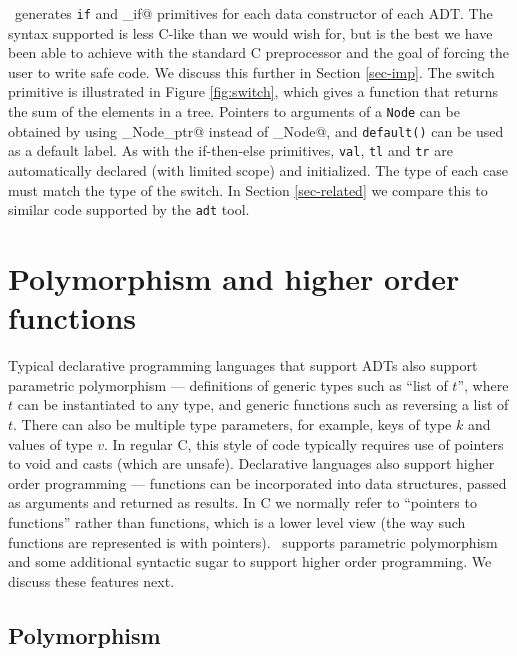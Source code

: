 \Adtpp\ generates \texttt{if} and \verb@else_if@ primitives for each
data constructor of each ADT.  The syntax supported is less C-like
than we would wish for, but is the best we have been able to achieve
with the standard C preprocessor and the goal of forcing the user to
write safe code.  We discuss this further in Section \ref{sec-imp}.
The switch primitive is illustrated in Figure \ref{fig:switch}, which
gives a function that returns the sum of the elements in a tree.
Pointers to arguments of a \texttt{Node} can be obtained by using
\verb@case_Node_ptr@ instead of \verb@case_Node@, and \texttt{default()}
can be used as a default label.
As with the if-then-else primitives, \texttt{val}, \texttt{tl} and
\texttt{tr} are automatically declared (with limited scope) and
initialized.  The type of each case must match the type of the switch.
In Section \ref{sec-related} we compare
this to similar code supported by the \texttt{adt} tool.

\section{Polymorphism and higher order functions}
\label{sec-polyho}

Typical declarative programming languages that support ADTs also support
parametric polymorphism --- definitions of generic types such as
``list of $t$'', where $t$ can be instantiated to any type, and generic
functions such as reversing a list of $t$.  There can also be multiple
type parameters, for example, keys of type $k$ and values of type $v$.
In regular C, this style of code typically requires use of pointers to
void and casts (which are unsafe).  Declarative languages also support
higher order programming --- functions can
be incorporated into data structures, passed as arguments and returned
as results.  In C we normally refer to ``pointers to functions'' rather
than functions, which is a lower level view (the way such functions are
represented is with pointers).  \Adtpp\ supports parametric polymorphism
and some additional syntactic sugar to support higher order programming.
We discuss these features next.

\subsection{Polymorphism}
\label{sec-poly}

